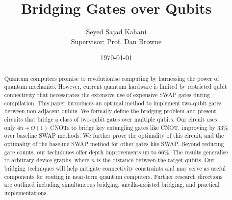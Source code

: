 \documentclass{report}
\title{Bridging Gates over Qubits}
\author{Seyed Sajad Kahani \\Supervisor: Prof. Dan Browne}
\date{\today}
\begin{document}
\maketitle

\tableofcontents

\begin{abstract}
  Quantum computers promise to revolutionise computing by harnessing the power of quantum mechanics. However, current quantum hardware is limited by restricted qubit connectivity that necessitates the extensive use of expensive SWAP gates during compilation. This paper introduces an optimal method to implement two-qubit gates between non-adjacent qubits. We formally define the bridging problem and present circuits that bridge a class of two-qubit gates over multiple qubits. Our circuit uses only $4n+O(1)$ CNOTs to bridge key entangling gates like CNOT, improving by $33\%$ over baseline SWAP methods. We further prove the optimality of this circuit, and the optimality of the baseline SWAP method for other gates like SWAP. Beyond reducing gate counts, our techniques offer depth improvements up to $66\%$. The results generalise to arbitrary device graphs, where $n$ is the distance between the target qubits. Our bridging techniques will help mitigate connectivity constraints and may serve as useful components for routing in near-term quantum computers. Further research directions are outlined including simultaneous bridging, ancilla-assisted bridging, and practical implementations.
\end{abstract}









\printbibliography
\end{document}
